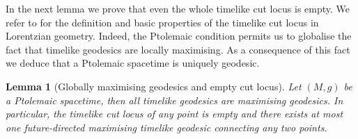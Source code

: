 \documentclass[hidelinks,12pt,a4paper]{article}
\numberwithin{equation}{section}
\theoremstyle{plain}
\newtheorem{lemma}[definition]{Lemma}
\theoremstyle{definition}
\begin{document}
In the next lemma we prove that even the whole timelike cut locus is empty. We refer to \cite[Chapter 9]{BeemBook} for the definition and basic properties of the timelike cut locus in Lorentzian geometry.
Indeed, the Ptolemaic condition permits us to globalise the fact that timelike geodesics are locally maximising. %
As a consequence of this fact we deduce that a Ptolemaic spacetime is uniquely geodesic.

\begin{lemma}[Globally maximising geodesics and empty cut locus]
\label{lem: Ptolemy imply maximising}
Let $(M,g)$ be a Ptolemaic spacetime, then all timelike geodesics are maximising geodesics. 
In particular, the timelike cut locus of any point is empty and there exists at most one future-directed maximising timelike geodesic connecting any two points.
\end{lemma}
\end{document}
